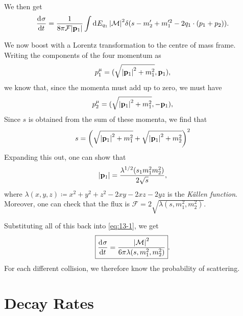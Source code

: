 We then get
\begin{equation}
  \label{eq:13-1}
  \dv[]{\sigma}{t} = \frac{1}{8\pi \mathcal{F} \abs{\vb{p}_1}} \int \dd[]{E_{q_1}} \abs{\mathcal{M}}^2 \delta(s - m_2' + m_1'^2 - 2q_1 \cdot (p_1 + p_2)).
\end{equation}

We now boost with a Lorentz transformation to the centre of mass frame.
Writing the components of the four momentum as
\begin{equation}
  p_1^{\mu} = (\sqrt{\abs{\vb{p}_1}^2 + m_1^2}, \vb{p}_1),
\end{equation}
we know that, since the momenta must add up to zero, we must have
\begin{equation}
  p_2^{\mu} = (\sqrt{\abs{\vb{p}_1}^2 + m_1^2}, -\vb{p}_1),
\end{equation}
Since $s$ is obtained from the sum of these momenta, we find that
\begin{equation}
  s = \qty(\sqrt{\abs{\vb{p}_1}^2 + m_1^2} + \sqrt{\abs{\vb{p}_1}^2 + m_2^2})^2
\end{equation}
Expanding this out, one can show that 
\begin{equation}
  \abs{\vb{p}_1} = \frac{\lambda^{1/2} (s_1 m_1^2 m_2^2)}{2 \sqrt{s}},
\end{equation}
where $\lambda(x, y, z) \coloneqq x^2 + y^2 + z^2 - 2xy - 2xz- 2yz$ is the \emph{Källen function}.
Moreover, one can check that the flux is $\mathcal{F} = 2 \sqrt{\lambda(s, m_1^2, m_2^2)}$.

Substituting all of this back into \eqref{eq:13-1}, we get
\begin{equation}
  \boxed{\dv[]{\sigma}{t} = \frac{\abs{\mathcal{M}}^2}{ 6 \pi \lambda (s, m_1^2, m_2^2)}}.
\end{equation}
For each different collision, we therefore know the probability of scattering.

\section{Decay Rates}%
\label{sec:decay_rates}

